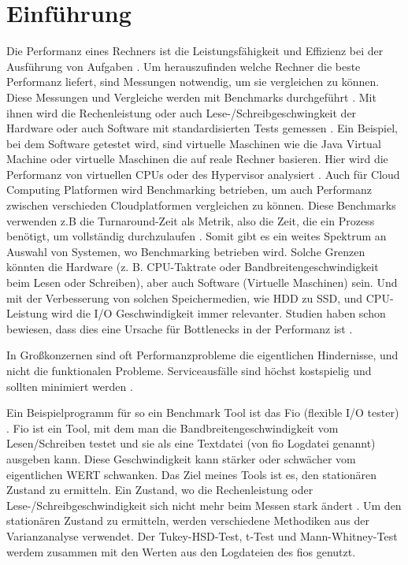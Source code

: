 \documentclass{article}
\begin{document}
\newpage
\section{Einführung}
Die Performanz eines Rechners ist die Leistungsfähigkeit und Effizienz bei der Ausführung von Aufgaben \cite{Delst}. Um herauszufinden welche Rechner die beste Performanz liefert, sind Messungen notwendig, um sie vergleichen zu können. Diese Messungen und Vergleiche werden mit Benchmarks durchgeführt \cite{takevalue}.
Mit ihnen wird die Rechenleistung oder auch Lese-/Schreibgeschwingkeit der Hardware oder auch Software mit standardisierten Tests gemessen \cite{benchmarkingBruno2014}. Ein Beispiel, bei dem Software getestet wird, sind virtuelle Maschinen wie die Java Virtual Machine \cite{10.1145/1297027.1297033} oder virtuelle Maschinen die auf reale Rechner basieren.
Hier wird die Performanz von virtuellen CPUs oder des Hypervisor analysiert \cite{9256518}.
Auch für Cloud Computing Platformen wird Benchmarking betrieben, um auch Performanz zwischen verschieden Cloudplatformen vergleichen zu können. Diese Benchmarks verwenden z.B die Turnaround-Zeit als Metrik, also die Zeit, die ein Prozess benötigt, um vollständig durchzulaufen \cite{10.1145/2493123.2462919}.  Somit gibt es ein weites Spektrum an Auswahl von Systemen, wo  Benchmarking betrieben wird.
Solche Grenzen könnten die Hardware (z. B. CPU-Taktrate oder Bandbreitengeschwindigkeit beim Lesen oder Schreiben), aber auch Software (Virtuelle Maschinen) sein.
Und mit der Verbesserung von solchen Speichermedien, wie HDD zu SSD, und CPU-Leistung wird die I/O Geschwindigkeit immer relevanter. Studien haben schon bewiesen, dass dies eine Ursache für Bottlenecks in der Performanz ist \cite{analysisNVMeSSD}.

In Großkonzernen sind oft Performanzprobleme die eigentlichen Hindernisse, und nicht die funktionalen Probleme. Serviceausfälle sind höchst kostspielig und sollten minimiert werden \cite{whenStopPerformanceTest}. 

Ein Beispielprogramm für so ein Benchmark Tool ist das Fio (flexible I/O tester) \cite{axboe2021github}.
Fio ist ein Tool, mit dem man die Bandbreitengeschwindigkeit vom Lesen/Schreiben testet und sie als eine Textdatei (von fio Logdatei genannt) ausgeben kann. Diese Geschwindigkeit kann stärker oder schwächer vom eigentlichen WERT schwanken. Das Ziel meines Tools ist es, den stationären Zustand zu ermitteln.
Ein Zustand, wo die Rechenleistung oder Lese-/Schreibgeschwindigkeit sich nicht mehr beim Messen stark ändert \cite{vmsHotandCold}. 
Um den stationären Zustand zu ermitteln, werden verschiedene Methodiken aus der Varianzanalyse verwendet. Der Tukey-HSD-Test, t-Test und Mann-Whitney-Test werdem zusammen mit den Werten aus den Logdateien des fios genutzt. 
\end{document}
